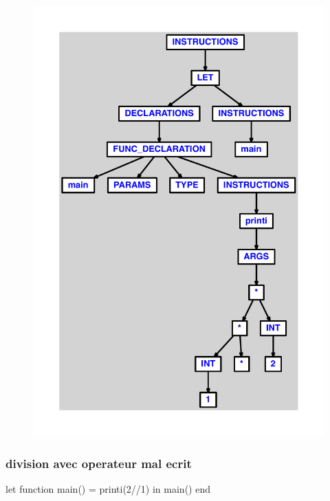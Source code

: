 \documentclass{article}
\begin{document}
\begin{figure}[H]\centering\includegraphics[max width=\textwidth]{ast/ast_24.pdf}\end{figure}\subsubsection{division avec operateur mal ecrit}
\begin{verbatimtab}
let
	function main() = printi(2//1)
in main() end
\end{verbatimtab}
\end{document}
